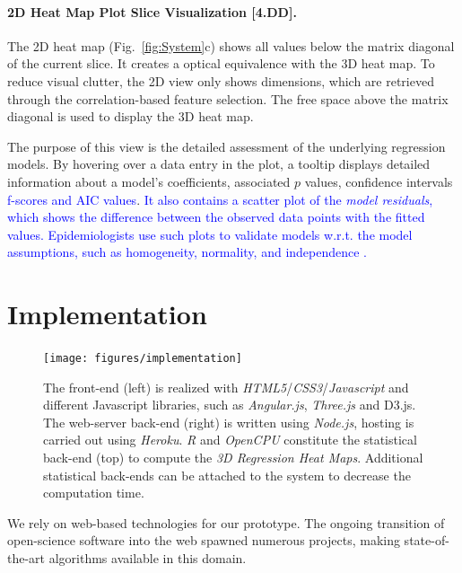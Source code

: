 \documentclass[journal]{style/vgtc} 			          %
\newcommand{\add}[1]{\textcolor{blue}{#1}}
\begin{document}
\paragraph{2D Heat Map Plot Slice Visualization [4.DD].}
The 2D heat map (Fig.~\ref{fig:System}c) shows all values below the matrix diagonal of the current slice.
It creates a optical equivalence with the 3D heat map.
To reduce visual clutter, the 2D view only shows dimensions, which are retrieved through the correlation-based feature selection.
The free space above the matrix diagonal is used to display the 3D heat map.

The purpose of this view is the detailed assessment of the underlying regression models.
By hovering over a data entry in the plot, a tooltip displays detailed information about a model's coefficients, associated $p$ values, confidence intervals \add{f-scores and AIC values}.
\add{
It also contains a scatter plot of the \emph{model residuals}, which shows the difference between the observed data points with the fitted values.
Epidemiologists use such plots to validate models w.r.t. the model assumptions, such as homogeneity, normality, and independence \cite{GraphicModelAssessment}.
}

\section{Implementation} \label{implementation}
\begin{figure}[htb]
 \centering
 \texttt{[image: figures/implementation]}
 \caption{
 The front-end (left) is realized with \emph{HTML5}/\emph{CSS3}/\emph{Javascript} and different Javascript libraries, such as \emph{Angular.js}, \emph{Three.js} and D3.js.
 The web-server back-end (right) is written using \emph{Node.js}, hosting is carried out using \emph{Heroku}.
 \emph{R} and \emph{OpenCPU} constitute the statistical back-end (top) to compute the \emph{3D Regression Heat Maps}.
 Additional statistical back-ends can be attached to the system to decrease the computation time.
 }
  \label{fig:Implementation}
\end{figure}
We rely on web-based technologies for our prototype.
The ongoing transition of open-science software into the web spawned numerous projects, making state-of-the-art algorithms available in this domain.
\end{document}
